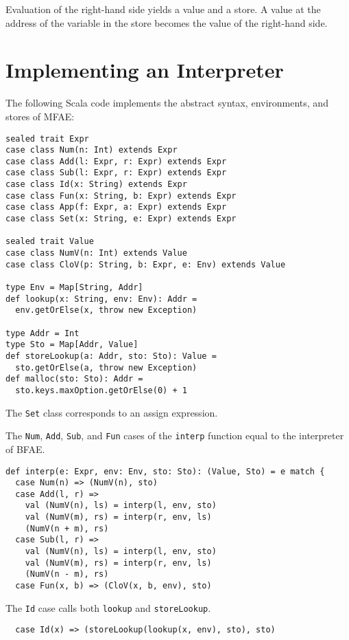 Evaluation of the right-hand side yields a value and a store. A value at the address of the variable in the store becomes the value of the right-hand side.

\section{Implementing an Interpreter}

The following Scala code implements the abstract syntax, environments, and stores of MFAE:

\begin{verbatim}
sealed trait Expr
case class Num(n: Int) extends Expr
case class Add(l: Expr, r: Expr) extends Expr
case class Sub(l: Expr, r: Expr) extends Expr
case class Id(x: String) extends Expr
case class Fun(x: String, b: Expr) extends Expr
case class App(f: Expr, a: Expr) extends Expr
case class Set(x: String, e: Expr) extends Expr

sealed trait Value
case class NumV(n: Int) extends Value
case class CloV(p: String, b: Expr, e: Env) extends Value

type Env = Map[String, Addr]
def lookup(x: String, env: Env): Addr =
  env.getOrElse(x, throw new Exception)

type Addr = Int
type Sto = Map[Addr, Value]
def storeLookup(a: Addr, sto: Sto): Value =
  sto.getOrElse(a, throw new Exception)
def malloc(sto: Sto): Addr =
  sto.keys.maxOption.getOrElse(0) + 1
\end{verbatim}

The \verb!Set! class corresponds to an assign expression.

The \verb!Num!, \verb!Add!, \verb!Sub!, and \verb!Fun! cases of the \verb!interp! function equal to the interpreter of BFAE.

\begin{verbatim}
def interp(e: Expr, env: Env, sto: Sto): (Value, Sto) = e match {
  case Num(n) => (NumV(n), sto)
  case Add(l, r) =>
    val (NumV(n), ls) = interp(l, env, sto)
    val (NumV(m), rs) = interp(r, env, ls)
    (NumV(n + m), rs)
  case Sub(l, r) =>
    val (NumV(n), ls) = interp(l, env, sto)
    val (NumV(m), rs) = interp(r, env, ls)
    (NumV(n - m), rs)
  case Fun(x, b) => (CloV(x, b, env), sto)
\end{verbatim}

The \verb!Id! case calls both \verb!lookup! and \verb!storeLookup!.

\begin{verbatim}
  case Id(x) => (storeLookup(lookup(x, env), sto), sto)
\end{verbatim}

